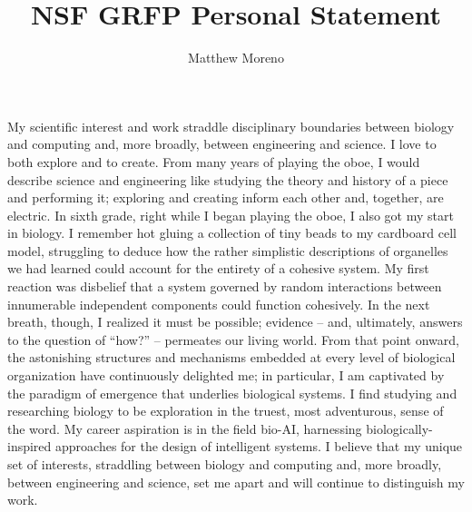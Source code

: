 \documentclass[12pt]{book}
\title{NSF GRFP Personal Statement}
\author{Matthew Moreno}
\begin{document}

My scientific interest and work straddle disciplinary boundaries between biology and computing and, more broadly, between engineering and science. I love to both explore and to create. From many years of playing the oboe, I would describe science and engineering like studying the theory and history of a piece and performing it; exploring and creating inform each other and, together, are electric. In sixth grade, right while I began playing the oboe, I also got my start in biology. I remember hot gluing a collection of tiny beads to my cardboard cell model, struggling to deduce how the rather simplistic descriptions of organelles we had learned could account for the entirety of a cohesive system. My first reaction was disbelief that a system governed by random interactions between innumerable independent components could function cohesively. In the next breath, though, I realized it must be possible; evidence -- and, ultimately, answers to the question of ``how?'' -- permeates our living world. From that point onward, the astonishing structures and mechanisms embedded at every level of biological organization have continuously delighted me; in particular, I am captivated by the paradigm of emergence that underlies biological systems. I find studying and researching biology to be exploration in the truest, most adventurous, sense of the word. My career aspiration is in the field bio-AI, harnessing biologically-inspired approaches for the design of intelligent systems. I believe that my unique set of interests, straddling between biology and computing and, more broadly, between engineering and science, set me apart and will continue to distinguish my work.
\end{document}
